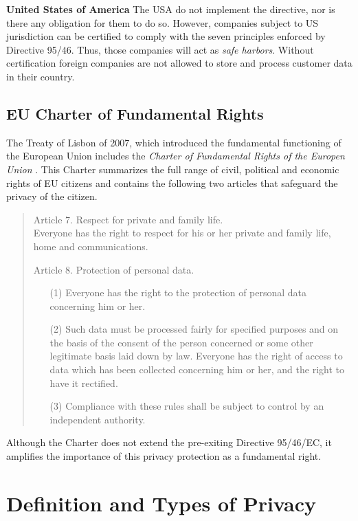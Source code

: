 \textbf{United States of America}
The USA do not implement the directive, nor is there any obligation for them to do so.
However, companies subject to US jurisdiction can be certified to comply with the seven principles enforced by Directive 95/46.
Thus, those companies will act as \emph{safe harbors}.
Without certification foreign companies are not allowed to store and process customer data in their country.


\subsection{EU Charter of Fundamental Rights}\label{sec:FR}
The Treaty of Lisbon of 2007, which introduced the fundamental functioning of the European Union
includes the \emph{Charter of Fundamental Rights of the Europen Union} \cite{EUFR2010}.
This Charter summarizes the full range of civil, political and economic rights of EU citizens and contains the following two articles that safeguard the privacy of the citizen.

\begin{quote}
  Article 7. Respect for private and family life.\\
  Everyone has the right to respect for his or her private and family life, home and communications.

  Article 8. Protection of personal data.
  \begin{enumerate}
    \item [(1)] Everyone has the right to the protection of personal data concerning him or her.
    \item [(2)] Such data must be processed fairly for specified purposes and on the basis of the consent of the person concerned or some other legitimate basis laid down by law.
      Everyone has the right of access to data which has been collected concerning him or her, and the right to have it rectified.
    \item [(3)] Compliance with these rules shall be subject to control by an independent authority.
  \end{enumerate}
\end{quote}

Although the Charter does not extend the pre-exiting Directive 95/46/EC, it amplifies the importance of this privacy protection as a fundamental right.

\section{Definition and Types of Privacy}
\label{sec:taxonomy}

